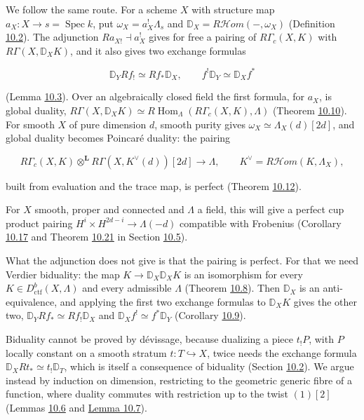 \documentclass[11pt]{article}
\providecommand{\cHom}{}\renewcommand{\cHom}{R\mathcal{H}\!om}
\begin{document}
We follow the same route. For a scheme \(X\) with structure map \(a_X:X\to s=\operatorname{Spec}k\), put \(\omega_X=a_X^!\Lambda_s\) and \(\mathbb D_X=\cHom(-,\omega_X)\) (Definition \hyperref[bp8]{10.2}). The adjunction \(Ra_{X!}\dashv a_X^!\) gives for free a pairing of \(R\Gamma_c(X,K)\) with \(R\Gamma(X,\mathbb D_XK)\), and it also gives two exchange formulas

\[
\mathbb D_YRf_!\simeq Rf_*\mathbb D_X,\qquad
f^!\mathbb D_Y\simeq\mathbb D_Xf^*
\]

(Lemma \hyperref[bp10]{10.3}). Over an algebraically closed field the first formula, for \(a_X\), is global duality, \(R\Gamma(X,\mathbb D_XK)\simeq R\!\operatorname{Hom}_\Lambda(R\Gamma_c(X,K),\Lambda)\) (Theorem \hyperref[bp32]{10.10}). For smooth \(X\) of pure dimension \(d\), smooth purity gives \(\omega_X\simeq\Lambda_X(d)[2d]\), and global duality becomes Poincaré duality: the pairing

\[
R\Gamma_c(X,K)\otimes^{\mathbf L}R\Gamma(X,K^\vee(d))[2d]
\longrightarrow\Lambda,\qquad K^\vee=\cHom(K,\Lambda_X),
\]

built from evaluation and the trace map, is perfect (Theorem \hyperref[bp37]{10.12}).

For \(X\) smooth, proper and connected and \(\Lambda\) a field, this will give a perfect cup product pairing \(H^i\times H^{2d-i}\to\Lambda(-d)\) compatible with Frobenius (Corollary \hyperref[bp52]{10.17} and Theorem \hyperref[bp65]{10.21} in Section \hyperref[bp54]{10.5}).

What the adjunction does not give is that the pairing is perfect. For that we need Verdier biduality: the map \(K\to\mathbb D_X\mathbb D_XK\) is an isomorphism for every \(K\in D^b_{\mathrm{ctf}}(X,\Lambda)\) and every admissible \(\Lambda\) (Theorem \hyperref[bp25]{10.8}). Then \(\mathbb D_X\) is an anti-equivalence, and applying the first two exchange formulas to \(\mathbb D_XK\) gives the other two, \(\mathbb D_YRf_*\simeq Rf_!\mathbb D_X\) and \(\mathbb D_Xf^!\simeq f^*\mathbb D_Y\) (Corollary \hyperref[bp28]{10.9}).

Biduality cannot be proved by dévissage, because dualizing a piece \(t_!P\), with \(P\) locally constant on a smooth stratum \(t:T\hookrightarrow X\), twice needs the exchange formula \(\mathbb D_XRt_*\simeq t_!\mathbb D_T\), which is itself a consequence of biduality (Section \hyperref[bp12]{10.2}). We argue instead by induction on dimension, restricting to the geometric generic fibre of a function, where duality commutes with restriction up to the twist \((1)[2]\) (Lemmas \hyperref[bp19]{10.6} and \hyperref[bp22]{Lemma 10.7}).
\end{document}
